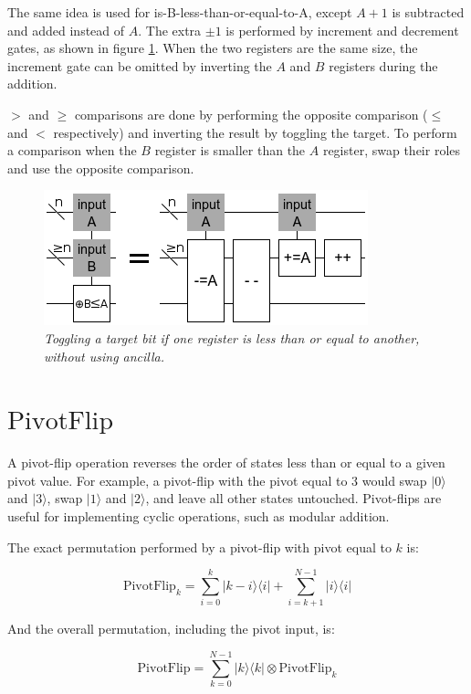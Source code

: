 \documentclass[twocolumn]{article}
\begin{document}
The same idea is used for is-B-less-than-or-equal-to-A, except $A+1$ is subtracted and added instead of $A$.
The extra $\pm 1$ is performed by increment and decrement gates, as shown in figure \ref{fig:comparison-leq}.
When the two registers are the same size, the increment gate can be omitted by inverting the $A$ and $B$ registers during the addition.

$>$ and $\geq$ comparisons are done by performing the opposite comparison ($\leq$ and $<$ respectively) and inverting the result by toggling the target.
To perform a comparison when the $B$ register is smaller than the $A$ register, swap their roles and use the opposite comparison.

\begin{figure}
  \centering
  \includegraphics[totalheight=3cm]{comparison-leq.png}
  \caption{\em Toggling a target bit if one register is less than or equal to another, without using ancilla.}
  \label{fig:comparison-leq}
\end{figure}

\section{$\text{PivotFlip}$}

A pivot-flip operation reverses the order of states less than or equal to a given pivot value.
For example, a pivot-flip with the pivot equal to 3 would swap $|0\rangle$ and $|3\rangle$, swap $|1\rangle$ and $|2\rangle$, and leave all other states untouched.
Pivot-flips are useful for implementing cyclic operations, such as modular addition.

The exact permutation performed by a pivot-flip with pivot equal to $k$ is:

$$\text{PivotFlip}_k = \sum_{i=0}^k |k-i\rangle \langle i| + \sum_{i=k+1}^{N-1} |i\rangle \langle i|$$

And the overall permutation, including the pivot input, is:

$$\text{PivotFlip} = \sum_{k=0}^{N-1} |k\rangle \langle k| \otimes \text{PivotFlip}_{k}$$
\end{document}
